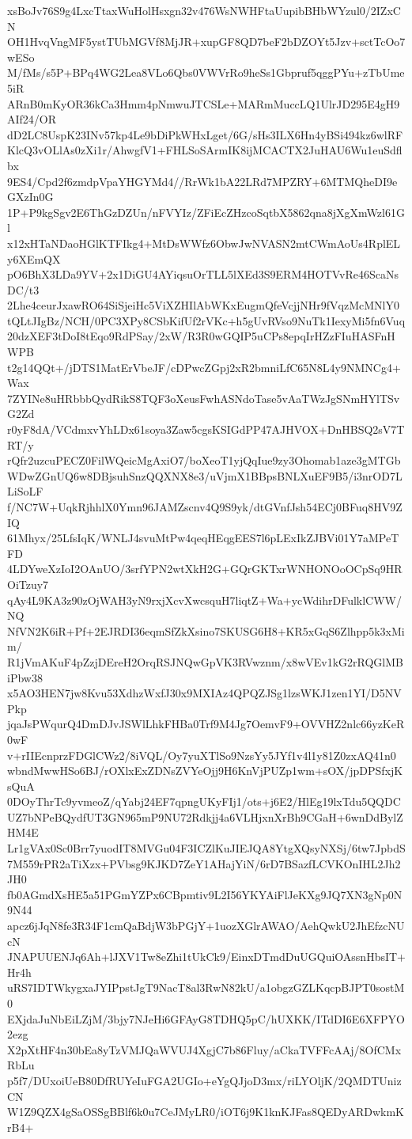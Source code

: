 xsBoJv76S9g4LxcTtaxWuHolHsxgn32v476WsNWHFtaUupibBHbWYzul0/2IZxCN
OH1HvqVngMF5ystTUbMGVf8MjJR+xupGF8QD7beF2bDZOYt5Jzv+sctTcOo7wESo
M/fMs/s5P+BPq4WG2Lea8VLo6Qbs0VWVrRo9heSs1Gbpruf5qggPYu+zTbUme5iR
ARnB0mKyOR36kCa3Hmm4pNmwuJTCSLe+MARmMuccLQ1UlrJD295E4gH9AIf24/OR
dD2LC8UspK23INv57kp4Le9bDiPkWHxLget/6G/sHs3ILX6Hn4yBSi494kz6wlRF
KlcQ3vOLlAs0zXi1r/AhwgfV1+FHLSoSArmIK8ijMCACTX2JuHAU6Wu1euSdflbx
9ES4/Cpd2f6zmdpVpaYHGYMd4//RrWk1bA22LRd7MPZRY+6MTMQheDI9eGXzIn0G
1P+P9kgSgv2E6ThGzDZUn/nFVYIz/ZFiEcZHzcoSqtbX5862qna8jXgXmWzl61Gl
x12xHTaNDaoHGlKTFIkg4+MtDsWWfz6ObwJwNVASN2mtCWmAoUs4RplELy6XEmQX
pO6BhX3LDa9YV+2x1DiGU4AYiqsuOrTLL5lXEd3S9ERM4HOTVvRe46ScaNsDC/t3
2Lhe4ceurJxawRO64SiSjeiHc5ViXZHIlAbWKxEugmQfeVcjjNHr9fVqzMcMNlY0
tQLtJIgBz/NCH/0PC3XPy8CSbKifUf2rVKc+h5gUvRVso9NuTk1IexyMi5fn6Vuq
20dzXEF3tDoI8tEqo9RdPSay/2xW/R3R0wGQIP5uCPs8epqIrHZzFIuHASFnHWPB
t2g14QQt+/jDTS1MatErVbeJF/cDPwcZGpj2xR2bmniLfC65N8L4y9NMNCg4+Wax
7ZYINe8uHRbbbQydRikS8TQF3oXeusFwhASNdoTase5vAaTWzJgSNmHYlTSvG2Zd
r0yF8dA/VCdmxvYhLDx61soya3Zaw5cgsKSIGdPP47AJHVOX+DnHBSQ2sV7TRT/y
rQfr2uzcuPECZ0FilWQeicMgAxiO7/boXeoT1yjQqIue9zy3Ohomab1aze3gMTGb
WDwZGnUQ6w8DBjsuhSnzQQXNX8e3/uVjmX1BBpsBNLXuEF9B5/i3nrOD7LLiSoLF
f/NC7W+UqkRjhhlX0Ymn96JAMZscnv4Q9S9yk/dtGVnfJsh54ECj0BFuq8HV9ZIQ
61Mhyx/25LfsIqK/WNLJ4svuMtPw4qeqHEqgEES7l6pLExIkZJBVi01Y7aMPeTFD
4LDYweXzIoI2OAnUO/3srfYPN2wtXkH2G+GQrGKTxrWNHONOoOCpSq9HROiTzuy7
qAy4L9KA3z90zOjWAH3yN9rxjXcvXwcsquH7liqtZ+Wa+ycWdihrDFulklCWW/NQ
NfVN2K6iR+Pf+2EJRDI36eqmSfZkXsino7SKUSG6H8+KR5xGqS6Zlhpp5k3xMim/
R1jVmAKuF4pZzjDEreH2OrqRSJNQwGpVK3RVwznm/x8wVEv1kG2rRQGlMBiPbw38
x5AO3HEN7jw8Kvu53XdhzWxfJ30x9MXIAz4QPQZJSg1lzsWKJ1zen1YI/D5NVPkp
jqaJsPWqurQ4DmDJvJSWlLhkFHBa0Trf9M4Jg7OemvF9+OVVHZ2nlc66yzKeR0wF
v+rIIEcnprzFDGlCWz2/8iVQL/Oy7yuXTlSo9NzsYy5JYf1v4l1y81Z0zxAQ41n0
wbndMwwHSo6BJ/rOXlxExZDNsZVYeOjj9H6KnVjPUZp1wm+sOX/jpDPSfxjKsQuA
0DOyThrTc9yvmeoZ/qYabj24EF7qpngUKyFIj1/ots+j6E2/HlEg19lxTdu5QQDC
UZ7bNPeBQydfUT3GN965mP9NU72Rdkjj4a6VLHjxnXrBh9CGaH+6wnDdBylZHM4E
Lr1gVAx0Sc0Brr7yuodIT8MVGu04F3ICZlKuJIEJQA8YtgXQsyNXSj/6tw7JpbdS
7M559rPR2aTiXzx+PVbsg9KJKD7ZeY1AHajYiN/6rD7BSazfLCVKOnIHL2Jh2JH0
fb0AGmdXsHE5a51PGmYZPx6CBpmtiv9L2I56YKYAiFlJeKXg9JQ7XN3gNp0N9N44
apcz6jJqN8fe3R34F1cmQaBdjW3bPGjY+1uozXGlrAWAO/AehQwkU2JhEfzcNUcN
JNAPUUENJq6Ah+lJXV1Tw8eZhi1tUkCk9/EinxDTmdDuUGQuiOAssnHbsIT+Hr4h
uRS7IDTWkygxaJYIPpstJgT9NacT8al3RwN82kU/a1obgzGZLKqcpBJPT0sostM0
EXjdaJuNbEiLZjM/3bjy7NJeHi6GFAyG8TDHQ5pC/hUXKK/ITdDI6E6XFPYO2ezg
X2pXtHF4n30bEa8yTzVMJQaWVUJ4XgjC7b86Fluy/aCkaTVFFcAAj/8OfCMxRbLu
p5f7/DUxoiUeB80DfRUYeIuFGA2UGIo+eYgQJjoD3mx/riLYOljK/2QMDTUnizCN
W1Z9QZX4gSaOSSgBBlf6k0u7CeJMyLR0/iOT6j9K1knKJFas8QEDyARDwkmKrB4+
